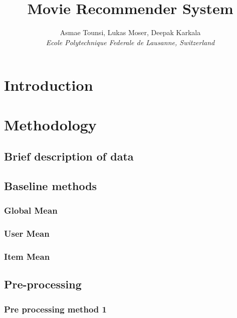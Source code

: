 \documentclass[10pt,conference,compsocconf]{IEEEtran}
\begin{document}
\title{Movie Recommender System}

\author{
   Asmae Tounsi, Lukas Moser, Deepak Karkala \\
  \textit{Ecole Polytechnique Federale de Lausanne, Switzerland}
}

\maketitle

\begin{abstract}
  
\end{abstract}

\section{Introduction}



\section{Methodology}
\label{sec:tips-writing}

\subsection{Brief description of data}

\subsection{Baseline methods}
\subsubsection{Global Mean}
\subsubsection{User Mean}
\subsubsection{Item Mean}

\subsection{Pre-processing}
\subsubsection{Pre processing method 1}
\end{document}
